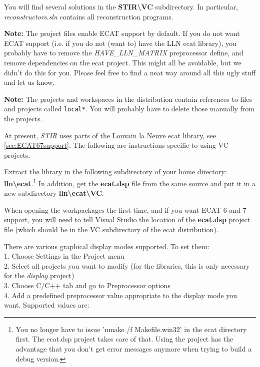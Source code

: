 \documentclass{article}
\newcommand{\tab}{\hspace{5mm}}
\begin{document}
You will find several solutions in the \textbf{STIR{\textbackslash}VC} subdirectory. 
In particular, \textit{reconstructors.sln} contains all reconstruction 
programs.



\textbf{Note:} The project files enable ECAT support by default. 
If you do not want ECAT support (i.e. if you do not (want to) 
have the LLN ecat library), you probably have to remove the \textit{HAVE\_LLN\_MATRIX} preprocessor 
define, and remove dependencies on the ecat project. This might 
all be avoidable, but we didn't do this for you. Please feel 
free to find a neat way around all this ugly stuff and let us 
know.

\textbf{Note:} The projects and workspaces in the distribution contain references to
files and projects called \texttt{local*}. You will probably have to delete those
manually from the projects.


At present, \textit{STIR} uses parts of the Louvain la Neuve ecat library, see \ref{sec:ECAT67support}. 
The following are instructions specific to using VC projects.

Extract 
the library in the following subdirectory of your home directory: \textbf{lln{\textbackslash}ecat}.\footnote{{\small You 
no longer have to issue 'nmake /f Makefile.win32' in the ecat 
directory first. The ecat.dsp project takes care of that. Using 
the project has the advantage that you don't get error messages 
anymore when trying to build a debug version.}} In addition, get 
the \textbf{ecat.dsp} file from the same source and put it in a new 
subdirectory \textbf{lln{\textbackslash}ecat{\textbackslash}VC}.



When opening the workpackages the first time, and if you want
ECAT 6 and 7 support, you will need to tell Visual 
Studio the location of the \textbf{ecat.dsp} project file (which should 
be in the VC subdirectory of the ecat distribution).


There are various graphical display modes supported. To set them:\\
1.\tab 
Choose Settings in the Project menu\\
2.\tab 
Select all projects you want to modify (for the libraries, this 
is only necessary for the \textit{display} project)\\
3.\tab 
Choose C/C++ tab and go to Preprocessor options\\
4.\tab 
Add a predefined preprocessor value appropriate to the display 
mode you want. Supported values are: 
\end{document}
